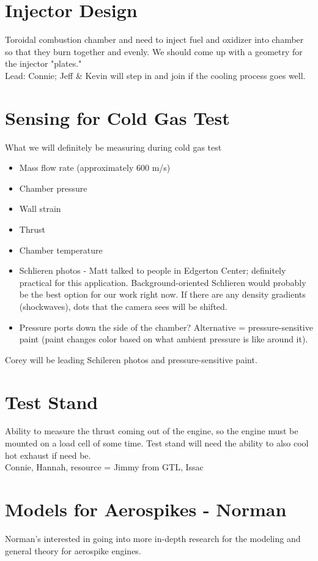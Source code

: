 \documentclass[12pt]{article}
\begin{document}
\section{Injector Design}
Toroidal combustion chamber and need to inject fuel and oxidizer into chamber so that they burn together and evenly. We should come up with a geometry for the injector "plates."\\

\noindent Lead: Connie; Jeff \& Kevin will step in and join if the cooling process goes well.

\section{Sensing for Cold Gas Test}
What we will definitely be measuring during cold gas test
\begin{itemize}
\item Mass flow rate (approximately 600 m/s)
\item Chamber pressure
\item Wall strain
\item Thrust
\item Chamber temperature
\item Schlieren photos - Matt talked to people in Edgerton Center; definitely practical for this application. Background-oriented Schlieren would probably be the best option for our work right now. If there are any density gradients (shockwaves), dots that the camera sees will be shifted.
\item Pressure ports down the side of the chamber? Alternative = pressure-sensitive paint (paint changes color based on what ambient pressure is like around it).
\end{itemize}

\noindent Corey will be leading Schileren photos and pressure-sensitive paint.

\section{Test Stand}
Ability to measure the thrust coming out of the engine, so the engine must be mounted on a load cell of some time. Test stand will need the ability to also cool hot exhaust if need be.\\

\noindent Connie, Hannah, resource = Jimmy from GTL, Issac

\section{Models for Aerospikes - Norman}
Norman's interested in going into more in-depth research for the modeling and general theory for aerospike engines.
\end{document}
